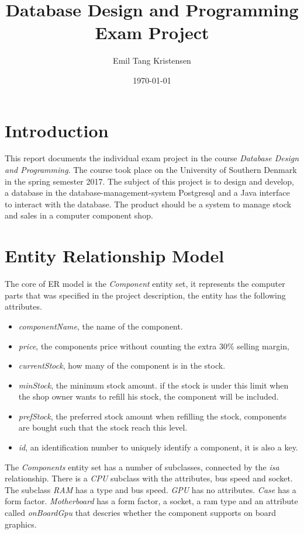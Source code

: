 \documentclass[12pt,a4paper]{article}
\title{\textbf{Database Design and Programming \\Exam Project}}
\author{Emil Tang Kristensen}
\date{\today}
\begin{document}
\maketitle
\tableofcontents

\newpage

\section{Introduction}
This report documents the individual exam project in the course \emph{Database Design and Programming}. 
The course took place on the University of Southern Denmark in the spring semester 2017.
The subject of this project is to design and develop, a database in the database-management-system Postgresql and a Java interface to interact with the database.  
The product should be a system to manage stock and sales in a computer component shop.

\section{Entity Relationship Model}
The core of ER model is the \emph{Component} entity set, it represents the computer parts that was specified in the project description, the entity has the following attributes.
\begin{itemize}
    \item \emph{componentName}, the name of the component.
    \item \emph{price}, the components price without counting the extra 30\% selling margin,
    \item \emph{currentStock}, how many of the component is in the stock.
    \item \emph{minStock}, the minimum stock amount. if the stock is under this limit when the shop owner wants to refill his stock, the component will be included.
    \item \emph{prefStock}, the preferred stock amount when refilling the stock, components are bought such that the stock reach this level.
    \item \emph{id}, an identification number to uniquely identify a component, it is also a key.
\end{itemize}
The \emph{Components} entity set has a number of subclasses, connected by the \emph{isa} relationship. 
There is a \emph{CPU} subclass with the attributes, bus speed and socket.
The subclass \emph{RAM} has a type and bus speed.
\emph{GPU} has no attributes.
\emph{Case} has a form factor.
\emph{Motherboard} has a form factor, a socket, a ram type and an attribute called \emph{onBoardGpu} that descries whether the component supports on board graphics.
\end{document}
